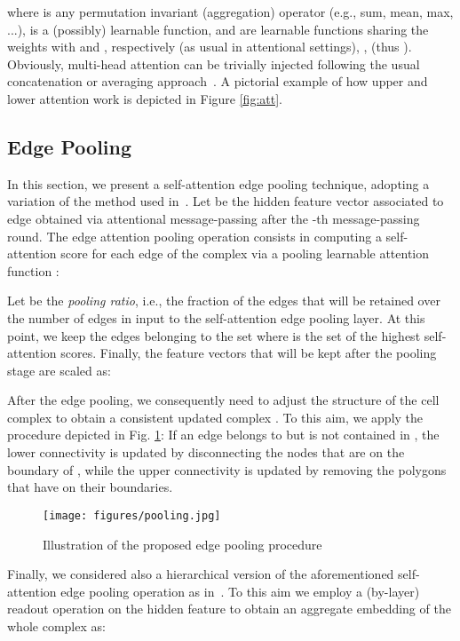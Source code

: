 \documentclass{article}
\begin{document}
where  is any permutation invariant (aggregation) operator (e.g., sum, mean, max, ...),  is a (possibly) learnable function,  and   are  learnable functions sharing the weights with  and , respectively (as usual in attentional settings),  ,  (thus ). Obviously, multi-head attention can be trivially injected following the usual concatenation or averaging approach~\cite{giusti22,velivckovic2017graph}. A pictorial example of how upper and lower attention work is depicted in Figure \ref{fig:att}.





\subsection{Edge Pooling} 

 In this section, we present a self-attention edge pooling technique, adopting a variation of the method used in~\cite{lee2019self}. Let  be the hidden feature vector associated to edge  obtained via attentional message-passing after the -th message-passing round. The edge attention pooling operation consists in computing a self-attention score  for each edge of the complex via a pooling learnable attention function  : 

Let  be the \emph{pooling ratio}, i.e., the fraction of the edges that will be retained over the number of edges in input to the self-attention edge pooling layer. At this point, we keep the  edges belonging to the set   where  is the set of  the highest  self-attention scores. Finally, the  feature vectors that will be kept after the pooling stage are scaled as:

After the edge pooling, we consequently need  to adjust the structure of the cell complex  to obtain a consistent updated complex  . To this aim, we apply the procedure depicted in Fig. \ref{fig:pooling}: If an edge  belongs to  but  is not contained in , the lower connectivity is updated by disconnecting the nodes that are on the boundary of , while the upper connectivity is updated by removing the polygons that have  on their boundaries.

\begin{figure}[t]
    \centering
    \texttt{[image: figures/pooling.jpg]}
    \caption{Illustration of the proposed edge pooling procedure}
    \label{fig:pooling}
\end{figure}

Finally, we considered also a hierarchical version of the aforementioned self-attention edge pooling operation as in~\cite{cangea2018towards}. To this aim we employ a (by-layer) readout operation on the hidden feature   to obtain an aggregate embedding of the whole complex  as:
 
\end{document}
